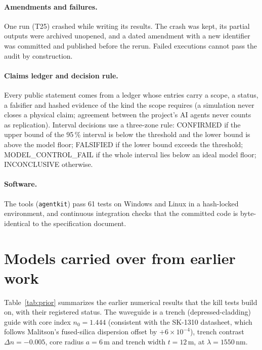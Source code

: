 \documentclass[10pt,a4paper]{article}
\begin{document}
\paragraph{Amendments and failures.} One run (T25) crashed while writing its results. The crash was kept, its partial outputs were archived unopened, and a dated amendment with a new identifier was committed and published before the rerun. Failed executions cannot pass the audit by construction.

\paragraph{Claims ledger and decision rule.} Every public statement comes from a ledger whose entries carry a scope, a status, a falsifier and hashed evidence of the kind the scope requires (a simulation never closes a physical claim; agreement between the project's AI agents never counts as replication). Interval decisions use a three-zone rule: CONFIRMED if the upper bound of the 95\,\% interval is below the threshold and the lower bound is above the model floor; FALSIFIED if the lower bound exceeds the threshold; MODEL\_CONTROL\_FAIL if the whole interval lies below an ideal model floor; INCONCLUSIVE otherwise.

\paragraph{Software.} The tools (\texttt{agentkit}) pass 61 tests on Windows and Linux in a hash-locked environment, and continuous integration checks that the committed code is byte-identical to the specification document.

\section{Models carried over from earlier work}

Table~\ref{tab:prior} summarizes the earlier numerical results that the kill tests build on, with their registered status. The waveguide is a trench (depressed-cladding) guide with core index $n_0=1.444$ (consistent with the SK-1310 datasheet, which follows Malitson's fused-silica dispersion offset by $+6\times10^{-4}$), trench contrast $\Delta n=-0.005$, core radius $a=6$\,\textmu m and trench width $t=12$\,\textmu m, at $\lambda=1550$\,nm.
\end{document}
